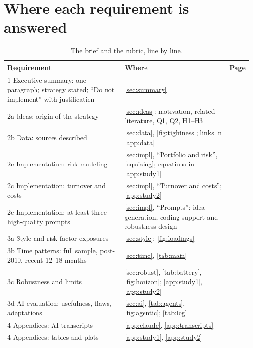 \documentclass[11pt,letterpaper]{article}
\begin{document}
\section{Where each requirement is answered}\label{app:map}\label{app:rubric}
\begin{table}[H]
\centering\footnotesize
\caption{The brief and the rubric, line by line.}
\begin{tabularx}{\textwidth}{@{}p{6.0cm} X r@{}}
\toprule
Requirement & Where & Page \\
\midrule
1 Executive summary: one paragraph; strategy stated; ``Do not implement'' with justification & \cref{sec:summary} & \pageref{sec:summary} \\
2a Ideas: origin of the strategy & \cref{sec:ideas}: motivation, related literature, Q1, Q2, H1--H3 & \pageref{sec:ideas} \\
2b Data: sources described & \cref{sec:data}, \cref{fig:tightness}; links in \cref{app:data} & \pageref{sec:data} \\
2c Implementation: risk modeling & \cref{sec:impl}, ``Portfolio and risk'', \cref{eq:sizing}; equations in \cref{app:study1} & \pageref{eq:sizing} \\
2c Implementation: turnover and costs & \cref{sec:impl}, ``Turnover and costs''; \cref{app:study2} & \pageref{sec:impl} \\
2c Implementation: at least three high-quality prompts & \cref{sec:impl}, ``Prompts'': idea generation, coding support and robustness design & \pageref{sec:impl} \\
3a Style and risk factor exposures & \cref{sec:style}; \cref{fig:loadings} & \pageref{sec:style} \\
3b Time patterns: full sample, post-2010, recent 12--18 months & \cref{sec:time}, \cref{tab:main} & \pageref{sec:time} \\
3c Robustness and limits & \cref{sec:robust}, \cref{tab:battery}, \cref{fig:horizon}; \cref{app:study1}, \cref{app:study2} & \pageref{sec:robust} \\
3d AI evaluation: usefulness, flaws, adaptations & \cref{sec:ai}, \cref{tab:agents}, \cref{fig:agentic}; \cref{tab:log} & \pageref{sec:ai} \\
4 Appendices: AI transcripts & \cref{app:claude}, \cref{app:transcripts} & \pageref{app:claude} \\
4 Appendices: tables and plots & \cref{app:study1}, \cref{app:study2} & \pageref{app:study1} \\

\end{tabularx}
\end{table}
\end{document}
